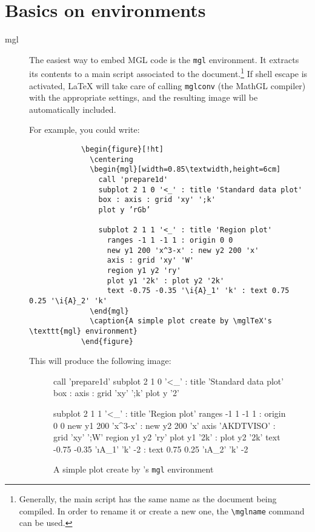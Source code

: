 \documentclass{article}
\begin{document}
	\section{Basics on environments}
	\begin{description}
		\item[mgl] The easiest way to embed MGL code is the \verb|mgl| environment. It extracts its contents to a main script associated to the document.\footnote{Generally, the main script has the same name as the document being compiled. In order to rename it or create a new one, the \texttt{\textbackslash mglname} command can be used.} If shell escape is activated, \LaTeX{} will take care of calling \verb|mglconv| (the MathGL compiler) with the appropriate settings, and the resulting image will be automatically included.
		
		For example, you could write:
		\begin{verbatim}
			\begin{figure}[!ht]
			  \centering
			  \begin{mgl}[width=0.85\textwidth,height=6cm]
			    call 'prepare1d'
			    subplot 2 1 0 '<_' : title 'Standard data plot'
			    box : axis : grid 'xy' ';k'
			    plot y ’rGb’
			    
			    subplot 2 1 1 '<_' : title 'Region plot'
				  ranges -1 1 -1 1 : origin 0 0
				  new y1 200 'x^3-x' : new y2 200 'x'
				  axis : grid 'xy' 'W'
				  region y1 y2 'ry'
				  plot y1 '2k' : plot y2 '2k'
				  text -0.75 -0.35 '\i{A}_1' 'k' : text 0.75 0.25 '\i{A}_2' 'k'
			  \end{mgl}
			  \caption{A simple plot create by \mglTeX's \texttt{mgl} environment}
			\end{figure}
		\end{verbatim}
		This will produce the following image:
		\begin{figure}[!ht]
			\centering
			\begin{mgl}[width=0.85\textwidth,height=5.5cm]
				call 'prepare1d'
				subplot 2 1 0 '<_' : title 'Standard data plot'
				box : axis : grid 'xy' ';k'
				plot y '2'
				
				subplot 2 1 1 '<_' : title 'Region plot'
				ranges -1 1 -1 1 : origin 0 0
				new y1 200 'x^3-x' : new y2 200 'x'
				axis 'AKDTVISO' : grid 'xy' ';W'
				region y1 y2 'ry'
				plot y1 '2k' : plot y2 '2k'
				text -0.75 -0.35 '\i{A}_1' 'k' -2 : text 0.75 0.25 '\i{A}_2' 'k' -2
			\end{mgl}
			\caption{A simple plot create by \mglTeX's \texttt{mgl} environment}
		\end{figure}
		

\end{description}
\end{document}
